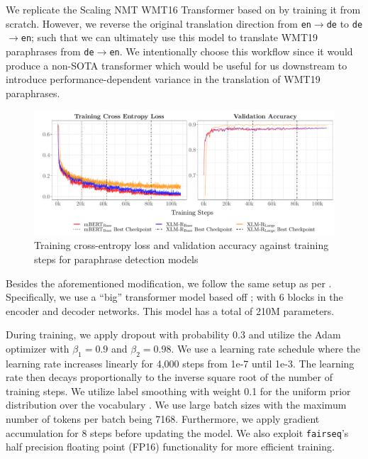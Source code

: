 \documentclass[11pt,a4paper]{article}
\begin{document}
We replicate the Scaling NMT WMT16 Transformer based on \citet{ott2018scaling} by training it from scratch. However, we reverse the original translation direction from \texttt{en$\rightarrow$de} to \texttt{de$\rightarrow$en}; such that we can ultimately use this model to translate WMT19 paraphrases from \texttt{de$\rightarrow$en}. We intentionally choose this workflow since it would produce a non-SOTA transformer which would be useful for us downstream to introduce performance-dependent variance in the translation of WMT19 paraphrases.

\begin{figure}
  \centering 
  \includegraphics[trim={0.7cm 0cm 0cm 0cm},clip,width=\textwidth]{paraphrase_detection_models_evolution.pdf}
  \caption{Training cross-entropy loss and validation accuracy against training steps for paraphrase detection models}
  \label{paraphrase_detection_model_evolution}
\end{figure}

Besides the aforementioned modification, we follow the same setup as per \citet{ott2018scaling}. Specifically, we use a ``big'' transformer model based off \citet{vaswani2017attention}; with 6 blocks in the encoder and decoder networks. This model has a total of 210M parameters.

During training, we apply dropout \cite{srivastava2014dropout} with probability 0.3 and utilize the Adam optimizer \cite{kingma2014adam} with $\beta_1 = 0.9$ and $\beta_2=0.98$. We use a learning rate schedule where the learning rate increases linearly for 4,000 steps from 1e-7 until 1e-3. The learning rate then decays proportionally to the inverse square root of the number of training steps. We utilize label smoothing with weight 0.1 for the uniform prior distribution over the vocabulary \cite{pereyra2017regularizing}. We use large batch sizes with the maximum number of tokens per batch being 7168. Furthermore, we apply gradient accumulation for 8 steps before updating the model. We also exploit \texttt{fairseq}'s half precision floating point (FP16) functionality for more efficient training.
\end{document}
